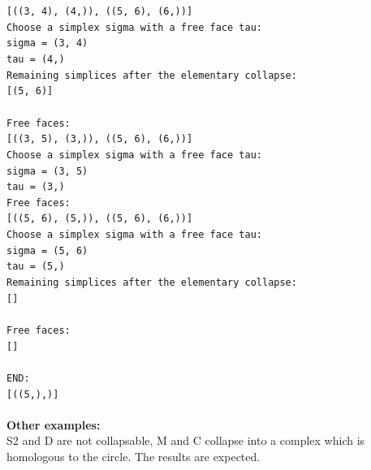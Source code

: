 \documentclass[a4paper,11pt]{article}
\begin{document}
\texttt{[((3, 4), (4,)), ((5, 6), (6,))]}\\
\texttt{Choose a simplex sigma with a free face tau:}\\
\texttt{sigma = (3, 4)}\\
\texttt{tau = (4,)}\\
\texttt{Remaining simplices after the elementary collapse:}\\
\texttt{[(5, 6)]}\\
 \\
\texttt{Free faces:}\\
\texttt{[((3, 5), (3,)), ((5, 6), (6,))]}\\
\texttt{Choose a simplex sigma with a free face tau:}\\
\texttt{sigma = (3, 5)}\\
\texttt{tau = (3,)}\\
\texttt{Free faces:}\\
\texttt{[((5, 6), (5,)), ((5, 6), (6,))]}\\
\texttt{Choose a simplex sigma with a free face tau:}\\
\texttt{sigma = (5, 6)}\\
\texttt{tau = (5,)}\\
\texttt{Remaining simplices after the elementary collapse:}\\
\texttt{[]}\\
 \\
\texttt{Free faces:}\\
\texttt{[]}\\
\\
\texttt{END: }\\
\texttt{[((5,),)]}
\\
\\
\textbf{Other examples:}
\\
S2 and D are not collapsable, M and C collapse into a complex which is homologous to the circle. The results are expected.

\end{document}
